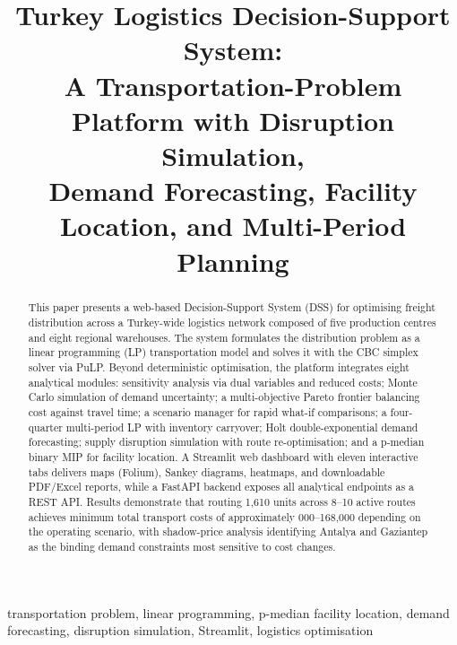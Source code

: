 \documentclass[conference]{IEEEtran}
\begin{document}
\title{Turkey Logistics Decision-Support System:\\
A Transportation-Problem Platform with Disruption Simulation,\\
Demand Forecasting, Facility Location, and Multi-Period Planning}

\author{
}

\maketitle

\begin{abstract}
This paper presents a web-based Decision-Support System (DSS)
for optimising freight distribution across a Turkey-wide logistics network
composed of five production centres and eight regional warehouses.
The system formulates the distribution problem as a linear programming (LP)
transportation model and solves it with the CBC simplex solver via PuLP.
Beyond deterministic optimisation, the platform integrates eight analytical
modules: sensitivity analysis via dual variables and reduced costs;
Monte Carlo simulation of demand uncertainty; a multi-objective Pareto
frontier balancing cost against travel time; a scenario manager for
rapid what-if comparisons; a four-quarter multi-period LP with inventory
carryover; Holt double-exponential demand forecasting; supply disruption
simulation with route re-optimisation; and a p-median binary MIP for
facility location.
A Streamlit web dashboard with eleven interactive tabs delivers maps
(Folium), Sankey diagrams, heatmaps, and downloadable PDF/Excel reports,
while a FastAPI backend exposes all analytical endpoints as a REST API.
Results demonstrate that routing 1{,}610 units across 8--10 active routes
achieves minimum total transport costs of approximately
000--168{,}000 depending on the operating scenario,
with shadow-price analysis identifying Antalya and Gaziantep as the
binding demand constraints most sensitive to cost changes.
\end{abstract}

\begin{IEEEkeywords}
transportation problem, linear programming, p-median facility location,
demand forecasting, disruption simulation, Streamlit, logistics optimisation
\end{IEEEkeywords}
\end{document}
